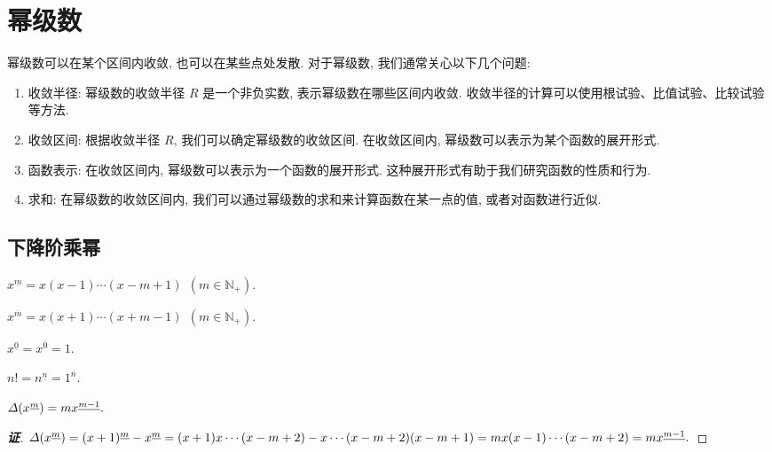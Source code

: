 \section{幂级数}

幂级数可以在某个区间内收敛, 也可以在某些点处发散. 对于幂级数, 我们通常关心以下几个问题: 

\begin{enumerate}
    \item 收敛半径: 幂级数的收敛半径 $R$ 是一个非负实数, 表示幂级数在哪些区间内收敛. 收敛半径的计算可以使用根试验、比值试验、比较试验等方法.
    \item 收敛区间: 根据收敛半径 $R$, 我们可以确定幂级数的收敛区间. 在收敛区间内, 幂级数可以表示为某个函数的展开形式.
    \item 函数表示: 在收敛区间内, 幂级数可以表示为一个函数的展开形式. 这种展开形式有助于我们研究函数的性质和行为.
    \item 求和: 在幂级数的收敛区间内, 我们可以通过幂级数的求和来计算函数在某一点的值, 或者对函数进行近似.
\end{enumerate}

\subsection{下降阶乘幂}

\begin{definition}[下降阶乘幂]
    $x^{\underline{m} }=x(x-1)\cdots(x-m+1)~~(m\in\mathbb{N}_+).$
\end{definition}

\begin{definition}[上升阶乘幂]
    $x^{\overline{m}}=x(x+1)\cdots(x+m-1)~~(m\in\mathbb{N}_+).$
\end{definition}

\begin{definition}
    $x^{\underline{0}}=x^{\overline{0}}=1.$
\end{definition}

\begin{theorem}[阶乘与阶乘幂]
    $n!=n^{\underline{n}}=1^{\overline{n}}.$
\end{theorem}

\begin{theorem}
    $\varDelta \qty(x^{\underline{m}})=mx^{\underline{m-1}}.$
\end{theorem}
\begin{proof}[{\songti \textbf{证}}]
    $\varDelta\qty(x^{\underline{m}})=(x+1)^{\underline{m}}-x^{\underline{m}}=(x+1)x\cdots(x-m+2)-x\cdots(x-m+2)(x-m+1)=mx(x-1)\cdots(x-m+2)=mx^{\underline{m-1}}.$
\end{proof}

